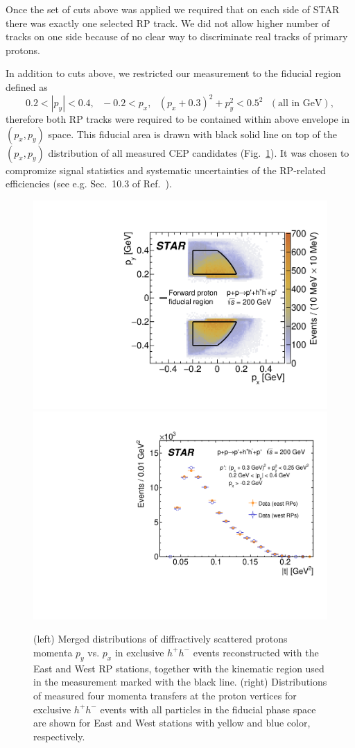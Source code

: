 Once the set of cuts above was applied we required that on each side of STAR there was exactly one selected RP track. We did not allow higher number of tracks on one side because of no clear way to discriminate real tracks of primary protons.

In addition to cuts above, we restricted our measurement to the fiducial region defined as
\begin{equation}\label{eq:RpFiducial}
0.2<|p_{y}|<0.4,~~~-0.2<p_{x},~~~(p_{x}+0.3)^{2}+p_{y}^{2}<0.5^{2}~~~(\text{all in GeV}), 
\end{equation}
therefore both RP tracks were required to be contained within above envelope in $(p_{x}, p_{y})$ space. This fiducial area is drawn with black solid line on top of the $(p_{x}, p_{y})$ distribution of all measured CEP candidates (Fig.~\ref{fig:rp_hits}). It was chosen to compromize signal statistics and systematic uncertainties of the RP-related efficiencies (see e.g. Sec.~10.3 of Ref.~\cite{supplementaryNote}).

\begin{figure}[b!]
\centering
\includegraphics[width=.465\textwidth]{graphics/eventSelection/RpTracks/PxPyExclusiveAllMerged.pdf}
\includegraphics[width=.523\textwidth]{graphics/eventSelection/RpTracks/Paper_MandelstamT.pdf}
%
\caption{(left) Merged distributions of diffractively scattered protons momenta $p_y$ vs. $p_x$ in exclusive $h^{+}h^{-}$ events reconstructed with the East and West RP stations, together with the kinematic region used in the measurement marked with the black line. (right) Distributions of measured four momenta transfers at the proton vertices for exclusive $h^{+}h^{-}$ events with all particles in the fiducial phase space are shown for East and West stations with yellow and blue color, respectively.}
\label{fig:rp_hits}
\end{figure}


